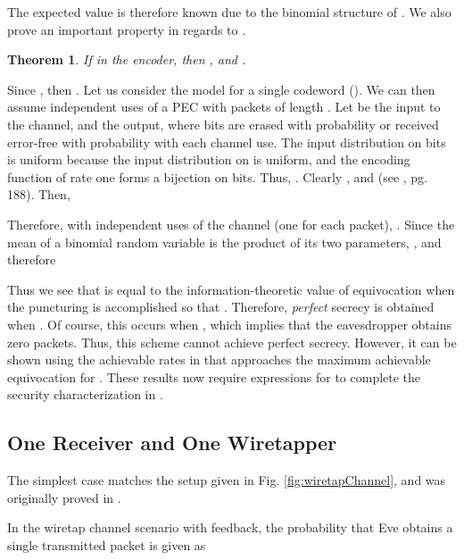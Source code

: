 \documentclass[10pt,twocolumn,twoside]{IEEEtran} \newlength{\pic}
\newtheorem{theorem}{Theorem}
\theoremstyle{definition}
\theoremstyle{remark}
\theoremstyle{plain}
\begin{document}
The expected value is therefore known due to the binomial structure of . We also prove an important property in regards to .
\begin{theorem}\label{thm:expectedValD}
 If  in the encoder, then , and .
\end{theorem}
\begin{IEEEproof}
 Since , then . Let us consider the model for a single codeword (). We can then assume  independent uses of a PEC with packets of length . Let  be the input to the channel, and  the output, where  bits are erased with probability  or received error-free with probability  with each channel use. The input distribution on  bits is uniform because the input distribution on  is uniform, and the encoding function of rate one forms a bijection on  bits. Thus, . Clearly , and  (see \cite{Cover}, pg. 188). Then,
 
 Therefore, with  independent uses of the channel (one for each packet), . Since the mean of a binomial random variable is the product of its two parameters, , and therefore
 
\end{IEEEproof}
Thus we see that  is equal to the information-theoretic value of equivocation when the puncturing is accomplished so that . Therefore, \emph{perfect} secrecy is obtained when . Of course, this occurs when , which implies that the eavesdropper obtains zero packets. Thus, this scheme cannot achieve perfect secrecy. However, it can be shown using the achievable rates in \cite{Wyner84} that  approaches the maximum achievable equivocation for . These results now require expressions for  to complete the security characterization in .

\subsection{One Receiver and One Wiretapper}

The simplest case matches the setup given in Fig. \ref{fig:wiretapChannel}, and was originally proved in \cite{Harrison10_ITW}.
\begin{lemma}\label{lem:wiretap1}
 In the wiretap channel scenario with feedback, the probability that Eve obtains a single transmitted packet is given as
 
\end{lemma}
\end{document}
